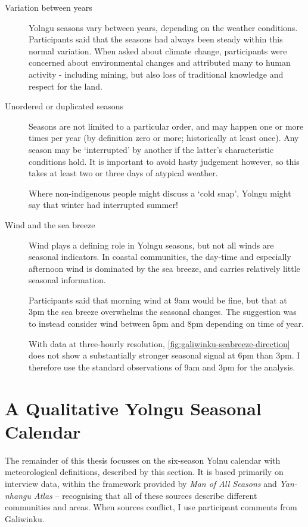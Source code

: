 \begin{description}
\item[Variation between years]
    Yolngu seasons vary between years, depending on the weather conditions.
    Participants said that the seasons had always been steady within this
    normal variation.  When asked about climate change, participants were
    concerned about environmental changes and attributed many to human
    activity - including mining, but also loss of traditional knowledge
    and respect for the land.

\item[Unordered or duplicated seasons]
    Seasons are not limited to a particular order, and may happen one or more
    times per year (by definition zero or more; historically at least once).
    Any season may be `interrupted' by another if the latter's characteristic
    conditions hold.  It is important to avoid hasty judgement however, so this
    takes at least two or three days of atypical weather.

    Where non-indigenous people might discuss a `cold snap', Yolngu might
    say that winter had interrupted summer!

\item[Wind and the sea breeze]
    Wind plays a defining role in Yolngu seasons, but not all winds are
    seasonal indicators.  In coastal communities, the day-time and especially
    afternoon wind is dominated by the sea breeze, and carries relatively little
    seasonal information.

    Participants said that morning wind at 9am would be fine, but that at
    3pm the sea breeze overwhelms the seasonal changes.  The suggestion was
    to instead consider wind between 5pm and 8pm depending on time of year.

    With data at three-hourly resolution, \cref{fig:galiwinku-seabreeze-direction}
    does not show a substantially stronger seasonal signal at 6pm than 3pm.
    I therefore use the standard observations of 9am and 3pm for the analysis.

\end{description}



\section{A Qualitative Yolngu Seasonal Calendar}
\label{sec:calendar-description}

The remainder of this thesis focusses on the six-season Yolnu calendar with
meteorological definitions, described by this section.
It is based primarily on interview data, within
the framework provided by \textit{Man of All Seasons} \citep{davis1989} and
\textit{Yan-nhangu Atlas} \citep{atlas2014} -- recognising that all of these
sources describe different communities and areas.  When sources conflict, I
use participant comments from Galiwinku.

